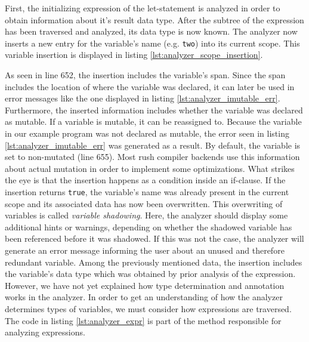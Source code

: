 First, the initializing expression of the let-statement is analyzed in order to obtain information about it's result data type.
After the subtree of the expression has been traversed and analyzed, its data type is now known.
The analyzer now inserts a new entry for the variable's name (e.g. \texttt{two}) into its current scope.
This variable insertion is displayed in listing \ref{lst:analyzer_scope_insertion}.


As seen in line 652, the insertion includes the variable's span.
Since the span includes the location of where the variable was declared,
it can later be used in error messages like the one displayed in listing \ref{lst:analyzer_imutable_err}.
Furthermore, the inserted information includes whether the variable was declared as mutable.
If a variable is mutable, it can be reassigned to.
Because the variable in our example program was not declared as mutable,
the error seen in listing \ref{lst:analyzer_imutable_err} was generated as a result.
By default, the variable is set to non-mutated (line 655).
Most rush compiler backends use this information about actual mutation in order to implement some optimizations.
What strikes the eye is that the insertion happens as a condition inside an if-clause.
If the insertion returns \texttt{true}, the variable's name was already present in the current scope and its associated data has now been overwritten.
This overwriting of variables is called \emph{variable shadowing}.
Here, the analyzer should display some additional hints or warnings, depending on whether the shadowed variable has been referenced before it was shadowed.
If this was not the case, the analyzer will generate an error message informing the user about an unused and therefore redundant variable.
Among the previously mentioned data, the insertion includes the variable's data type which was obtained by prior analysis of the expression.
However, we have not yet explained how type determination and annotation works in the analyzer.
In order to get an understanding of how the analyzer determines types of variables, we must consider how expressions are traversed.
The code in listing \ref{lst:analyzer_expr} is part of the method responsible for analyzing expressions.


